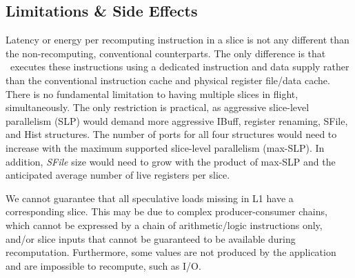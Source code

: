 \subsection{Limitations \& Side Effects}
\label{sec:limitations}
 
Latency or energy per recomputing instruction in a slice is not any different than the non-recomputing, conventional counterparts. 
The only difference is that \arch\ executes these instructions using a dedicated instruction and data supply rather than the conventional instruction cache and physical register file/data cache.
There is no fundamental limitation to having multiple slices in flight, simultaneously.
The only restriction is practical, as aggressive slice-level parallelism (SLP) would demand more aggressive IBuff, register renaming, SFile, and Hist structures. The number of ports for all four structures would need to increase with the maximum supported slice-level parallelism (max-SLP). In addition, %
\textit{SFile} size would need to grow with the product of max-SLP and the anticipated average number of live registers per slice.

We cannot guarantee that all speculative loads missing in L1 have a corresponding slice. 
This may be due to complex producer-consumer chains, which cannot be expressed by a chain of arithmetic/logic instructions only, and/or slice inputs that cannot be guaranteed to be available during recomputation. 
Furthermore, some values are not produced by the application and are impossible to recompute, such as I/O.

